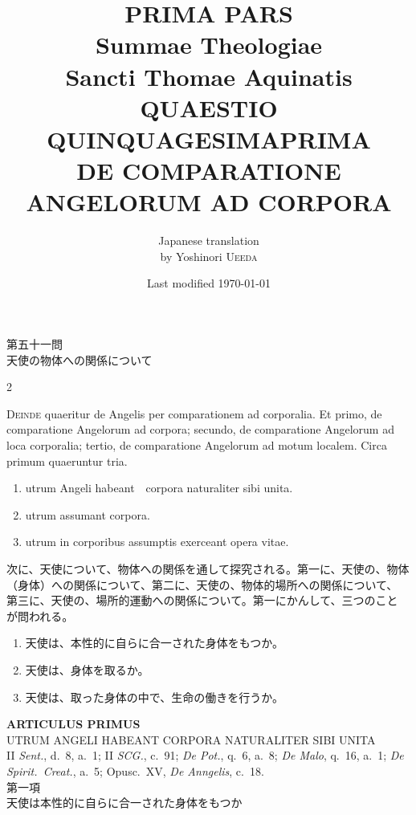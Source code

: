 \documentclass[paper=a4paper,fontsize=10pt,jafontsize=9pt,titlepage]{jlreq}
\title{{\bfseries PRIMA PARS}\\{\Huge Summae Theologiae}\\Sancti Thomae
Aquinatis\\{\sffamily QUAESTIO QUINQUAGESIMAPRIMA}\\DE COMPARATIONE
ANGELORUM AD CORPORA}
\author{Japanese translation\\by Yoshinori {\scshape Ueeda}}
\date{Last modified \today}
\begin{document}
\maketitle
\pagestyle{fancy}

\begin{center}
{\Large 第五十一問\\天使の物体への関係について}
\end{center}

\begin{paracol}{2}

{\huge D}{\scshape einde} quaeritur de Angelis per comparationem ad
corporalia. Et primo, de comparatione Angelorum ad corpora; secundo, de
comparatione Angelorum ad loca corporalia; tertio, de comparatione
Angelorum ad motum localem. Circa primum quaeruntur tria.


\begin{enumerate}
 \item utrum Angeli habeant　corpora naturaliter sibi unita. 
 \item utrum assumant corpora. 
 \item utrum in corporibus assumptis exerceant opera vitae.
\end{enumerate}

\switchcolumn

次に、天使について、物体への関係を通して探究される。第一に、天使の、物体
 （身体）への関係について、第二に、天使の、物体的場所への関係について、
 第三に、天使の、場所的運動への関係について。第一にかんして、三つのこと
 が問われる。

\begin{enumerate}
 \item 天使は、本性的に自らに合一された身体をもつか。
 \item 天使は、身体を取るか。
 \item 天使は、取った身体の中で、生命の働きを行うか。
\end{enumerate}

\end{paracol}
\newpage
{}
{}
\setcounter{section}{1}
\setcounter{subsection}{0}



\begin{center}
 {\Large {\bfseries ARTICULUS PRIMUS}}\\
 {\large UTRUM ANGELI HABEANT CORPORA NATURALITER SIBI UNITA}\\
 {\footnotesize II {\itshape Sent.}, d.~8, a.~1; II {\itshape SCG.},
 c.~91; {\itshape De Pot.}, q.~6, a.~8; {\itshape De Malo}, q.~16, a.~1;
 {\itshape De Spirit.~Creat.}, a.~5; Opusc.~XV, {\itshape De Anngelis}, c.~18.}\\
 {\Large 第一項\\天使は本性的に自らに合一された身体をもつか}
\end{center}
\end{document}
